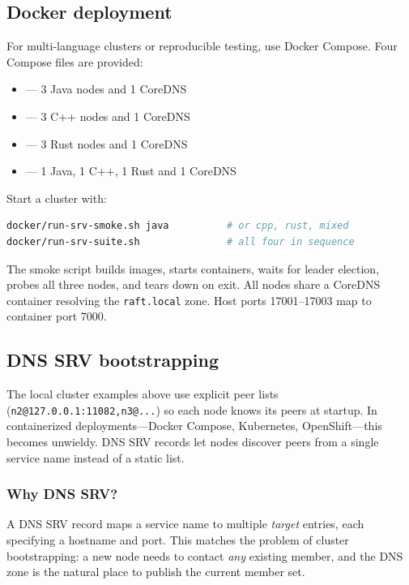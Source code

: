 \subsection{Docker deployment}
\label{sec:GettingStartedDocker}

For multi-language clusters or reproducible testing, use Docker Compose.
Four Compose files are provided:

\begin{itemize}
\item {} --- 3 Java nodes and 1 CoreDNS
\item {} --- 3 C++ nodes and 1 CoreDNS
\item {} --- 3 Rust nodes and 1 CoreDNS
\item {} --- 1 Java, 1 C++, 1 Rust and 1 CoreDNS
\end{itemize}

Start a cluster with:

\begin{lstlisting}[language=bash,caption={Docker smoke test}]
docker/run-srv-smoke.sh java          # or cpp, rust, mixed
docker/run-srv-suite.sh               # all four in sequence
\end{lstlisting}

The smoke script builds images, starts containers, waits for leader election,
probes all three nodes, and tears down on exit. All nodes share a CoreDNS
container resolving the \texttt{raft.local} zone. Host ports 17001--17003
map to container port 7000.

\subsection{DNS SRV bootstrapping}
\label{sec:DnsSrvBootstrapping}

The local cluster examples above use explicit peer lists
(\texttt{n2@127.0.0.1:11082,n3@...}) so each node knows its peers at startup.
In containerized deployments---Docker Compose, Kubernetes, OpenShift---this
becomes unwieldy. DNS SRV records let nodes discover peers from a single
service name instead of a static list.

\subsubsection{Why DNS SRV?}

A DNS SRV record maps a service name to multiple \emph{target} entries, each
specifying a hostname and port. This matches the problem of cluster
bootstrapping: a new node needs to contact \emph{any} existing member, and
the DNS zone is the natural place to publish the current member set.

